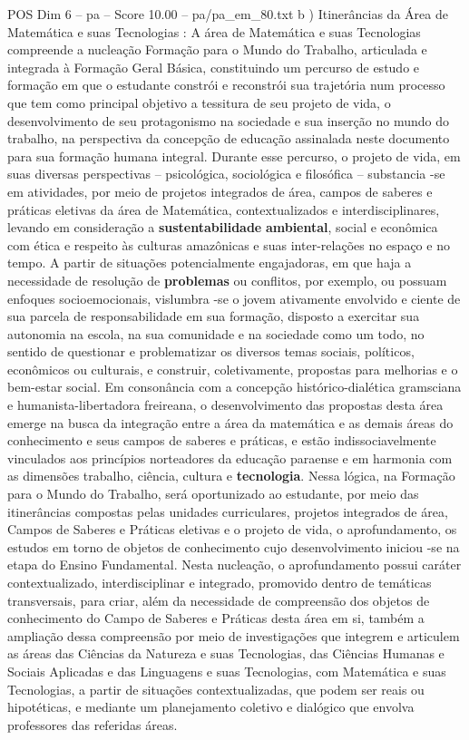 \begin{textsample}{POS Dim 6 – pa – Score 10.00 – pa/pa\_em\_80.txt}  \label{ex:f6_pos_065}
b ) Itinerâncias da Área de Matemática e suas Tecnologias : A área de Matemática e suas Tecnologias compreende a nucleação Formação para o Mundo do Trabalho, articulada e integrada à Formação Geral Básica, constituindo um percurso de estudo e formação em que o estudante constrói e reconstrói sua trajetória num processo que tem como principal objetivo a tessitura de seu projeto de vida, o desenvolvimento de seu protagonismo na sociedade e sua inserção no mundo do trabalho, na perspectiva da concepção de educação assinalada neste documento para sua formação humana integral.
Durante esse percurso, o projeto de vida, em suas diversas perspectivas – psicológica, sociológica e filosófica – substancia -se em atividades, por meio de projetos integrados de área, campos de saberes e práticas eletivas da área de Matemática, contextualizados e interdisciplinares, levando em consideração a \textbf{sustentabilidade} \textbf{ambiental}, social e econômica com ética e respeito às culturas amazônicas e suas inter-relações no espaço e no tempo.
A partir de situações potencialmente engajadoras, em que haja a necessidade de resolução de \textbf{problemas} ou conflitos, por exemplo, ou possuam enfoques socioemocionais, vislumbra -se o jovem ativamente envolvido e ciente de sua parcela de responsabilidade em sua formação, disposto a exercitar sua autonomia na escola, na sua comunidade e na sociedade como um todo, no sentido de questionar e problematizar os diversos temas sociais, políticos, econômicos ou culturais, e construir, coletivamente, propostas para melhorias e o bem-estar social.
Em consonância com a concepção histórico-dialética gramsciana e humanista-libertadora freireana, o desenvolvimento das propostas desta área emerge na busca da integração entre a área da matemática e as demais áreas do conhecimento e seus campos de saberes e práticas, e estão indissociavelmente vinculados aos princípios norteadores da educação paraense e em harmonia com as dimensões trabalho, ciência, cultura e \textbf{tecnologia}.
Nessa lógica, na Formação para o Mundo do Trabalho, será oportunizado ao estudante, por meio das itinerâncias compostas pelas unidades curriculares, projetos integrados de área, Campos de Saberes e Práticas eletivas e o projeto de vida, o aprofundamento, os estudos em torno de objetos de conhecimento cujo desenvolvimento iniciou -se na etapa do Ensino Fundamental.
Nesta nucleação, o aprofundamento possui caráter contextualizado, interdisciplinar e integrado, promovido dentro de temáticas transversais, para criar, além da necessidade de compreensão dos objetos de conhecimento do Campo de Saberes e Práticas desta área em si, também a ampliação dessa compreensão por meio de investigações que integrem e articulem as áreas das Ciências da Natureza e suas Tecnologias, das Ciências Humanas e Sociais Aplicadas e das Linguagens e suas Tecnologias, com Matemática e suas Tecnologias, a partir de situações contextualizadas, que podem ser reais ou hipotéticas, e mediante um planejamento coletivo e dialógico que envolva professores das referidas áreas.

\end{textsample}
